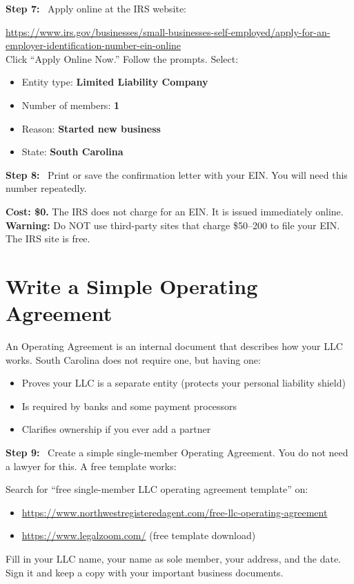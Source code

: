 \documentclass[12pt, letterpaper, oneside]{book}
\newcommand{\step}[1]{\noindent\textbf{\textcolor{primary}{Step #1:}}~}
\begin{document}
\step{7} Apply online at the IRS website:
\begin{actionbox}
\url{https://www.irs.gov/businesses/small-businesses-self-employed/apply-for-an-employer-identification-number-ein-online}\\[4pt]
Click ``Apply Online Now.'' Follow the prompts. Select:
\begin{itemize}[leftmargin=1.5em]
  \item Entity type: \textbf{Limited Liability Company}
  \item Number of members: \textbf{1}
  \item Reason: \textbf{Started new business}
  \item State: \textbf{South Carolina}
\end{itemize}
\end{actionbox}

\step{8} Print or save the confirmation letter with your EIN. You will need this number repeatedly.

\begin{successbox}
\textbf{Cost: \$0.} The IRS does not charge for an EIN. It is issued immediately online.\\[4pt]
\textbf{Warning:} Do NOT use third-party sites that charge \$50--200 to file your EIN. The IRS site is free.
\end{successbox}

\section{Write a Simple Operating Agreement}

An Operating Agreement is an internal document that describes how your LLC works. South Carolina does not require one, but having one:
\begin{itemize}[leftmargin=2em]
  \item Proves your LLC is a separate entity (protects your personal liability shield)
  \item Is required by banks and some payment processors
  \item Clarifies ownership if you ever add a partner
\end{itemize}

\step{9} Create a simple single-member Operating Agreement. You do not need a lawyer for this. A free template works:
\begin{actionbox}
Search for ``free single-member LLC operating agreement template'' on:
\begin{itemize}[leftmargin=1.5em]
  \item \url{https://www.northwestregisteredagent.com/free-llc-operating-agreement}
  \item \url{https://www.legalzoom.com/} (free template download)
\end{itemize}
Fill in your LLC name, your name as sole member, your address, and the date.\\
Sign it and keep a copy with your important business documents.
\end{actionbox}
\end{document}
